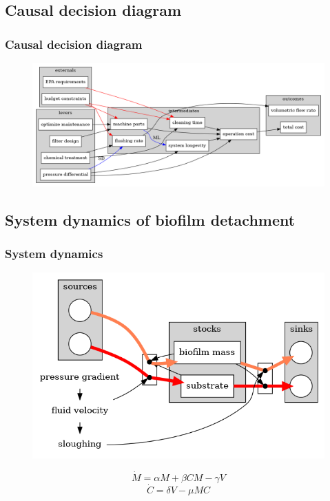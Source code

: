 \documentclass[
	11pt, %
]{beamer}
\begin{document}
\subsection{Causal decision diagram}

\begin{frame}
    \frametitle{Causal decision diagram}
	\begin{figure}
		\includegraphics[width=1.0\linewidth]{causal_decision_diagram.png}
	\end{figure}
\end{frame}


\subsection{System dynamics of biofilm detachment}

\begin{frame}
    \frametitle{System dynamics }
	\begin{figure}
		\includegraphics[width=0.7\linewidth]{system_dynamics_diagram.png}
	\end{figure}
	\vspace{-1.5cm}
	\begin{center}
	    \begin{equation*}
            \dot{M}=\alpha M + \beta CM - \gamma V
		\end{equation*}
		\begin{equation*}
            \dot{C}=\delta V - \mu MC
		\end{equation*}
    \end{center}

\end{frame}
\end{document}

